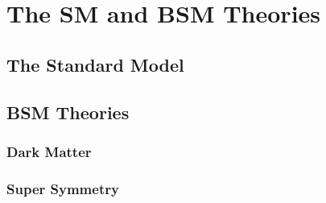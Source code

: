 \chapter{The SM and BSM Theories}\label{ch:smandbsm}


\section{The Standard Model}
\section{BSM Theories}
\subsection{Dark Matter}
\subsection{Super Symmetry}











